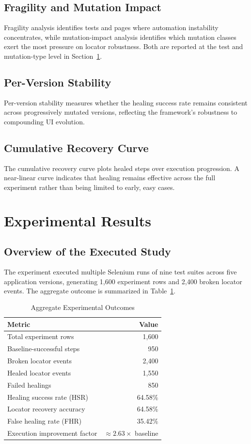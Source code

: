 \documentclass[conference]{IEEEtran}
\begin{document}
\subsection{Fragility and Mutation Impact}
Fragility analysis identifies tests and pages where automation instability concentrates, while mutation-impact analysis identifies which mutation classes exert the most pressure on locator robustness. Both are reported at the test and mutation-type level in Section~\ref{sec:results}.

\subsection{Per-Version Stability}
Per-version stability measures whether the healing success rate remains consistent across progressively mutated versions, reflecting the framework's robustness to compounding UI evolution.

\subsection{Cumulative Recovery Curve}
The cumulative recovery curve plots healed steps over execution progression. A near-linear curve indicates that healing remains effective across the full experiment rather than being limited to early, easy cases.

\section{Experimental Results}
\label{sec:results}

\subsection{Overview of the Executed Study}
The experiment executed multiple Selenium runs of nine test suites across five application versions, generating 1{,}600 experiment rows and 2{,}400 broken locator events. The aggregate outcome is summarized in Table~\ref{tab:aggregate_outcomes}.

\begin{table}[H]
\centering
\caption{Aggregate Experimental Outcomes}
\label{tab:aggregate_outcomes}
\begin{tabular}{lr}
\toprule
\textbf{Metric} & \textbf{Value} \\
\midrule
Total experiment rows & 1{,}600 \\
Baseline-successful steps & 950 \\
Broken locator events & 2{,}400 \\
Healed locator events & 1{,}550 \\
Failed healings & 850 \\
Healing success rate (HSR) & 64.58\% \\
Locator recovery accuracy & 64.58\% \\
False healing rate (FHR) & 35.42\% \\
Execution improvement factor & $\approx 2.63\times$ baseline \\
\bottomrule
\end{tabular}
\end{table}
\end{document}
